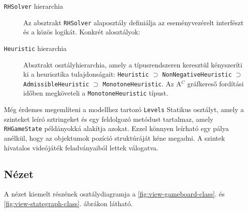 \begin{description}
    \item[\texttt{RHSolver} hierarchia] Az absztrakt \texttt{RHSolver} alaposztály definiálja az eseményvezérelt interfészt és a közös logikát. Konkrét alosztályok:
    
    \item[\texttt{Heuristic} hierarchia] Absztrakt osztályhierarchia, amely a típusrendszeren keresztül kényszeríti ki a heurisztika tulajdonságait: \texttt{Heuristic} $\supset$ \texttt{NonNegativeHeuristic} $\supset$ \texttt{AdmissibleHeuristic} $\supset$ \texttt{MonotoneHeuristic}. Az A$^C$ gráfkereső fordítási időben megköveteli a \texttt{MonotoneHeuristic} típust.
\end{description}

Még érdemes megemlíteni a modellhez tartozó \texttt{Levels} Statikus osztályt, amely a szinteket leíró sztringeket és egy feldolgozó metódust tartalmaz, amely \texttt{RHGameState} példányokká alakítja azokat. Ezzel könnyen leírható egy pálya anélkül, hogy az objektumok pozíció struktúráját kéne megadni. A szintek hivatalos videójáték feladványaiból lettek válogatva.~\cite{rushhour_video_game}


\subsection{Nézet}
\label{sec:view}

A nézet kiemelt részének osztálydiagramja a \ref{fig:view-gameboard-class}. és \ref{fig:view-stategraph-class}. ábrákon látható.

